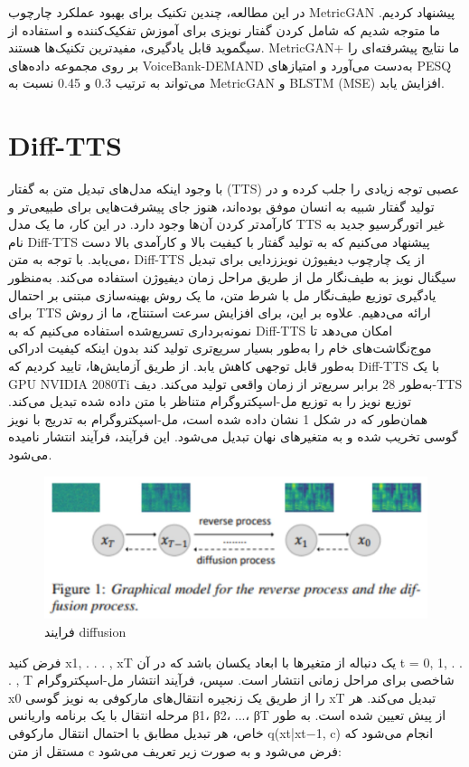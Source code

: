 \documentclass[fleqn]{report}
\begin{document}
در این مطالعه، چندین تکنیک برای بهبود عملکرد چارچوب MetricGAN پیشنهاد کردیم. ما متوجه شدیم که شامل کردن گفتار نویزی برای آموزش تفکیک‌کننده و استفاده از سیگموید قابل یادگیری، مفیدترین تکنیک‌ها هستند. MetricGAN+ ما نتایج پیشرفته‌ای را بر روی مجموعه داده‌های VoiceBank-DEMAND به‌دست می‌آورد و امتیازهای PESQ می‌تواند به ترتیب 0.3 و 0.45 نسبت به MetricGAN و BLSTM (MSE) افزایش یابد.

\section{Diff-TTS}
با وجود اینکه مدل‌های تبدیل متن به گفتار (TTS) عصبی توجه زیادی را جلب کرده و در تولید گفتار شبیه به انسان موفق بوده‌اند، هنوز جای پیشرفت‌هایی برای طبیعی‌تر و کارآمدتر کردن آن‌ها وجود دارد. در این کار، ما یک مدل TTS غیر اتورگرسیو جدید به نام Diff-TTS پیشنهاد می‌کنیم که به تولید گفتار با کیفیت بالا و کارآمدی بالا دست می‌یابد. با توجه به متن، Diff-TTS از یک چارچوب دیفیوژن نویززدایی برای تبدیل سیگنال نویز به طیف‌نگار مل از طریق مراحل زمان دیفیوژن استفاده می‌کند. به‌منظور یادگیری توزیع طیف‌نگار مل با شرط متن، ما یک روش بهینه‌سازی مبتنی بر احتمال برای TTS ارائه می‌دهیم. علاوه بر این، برای افزایش سرعت استنتاج، ما از روش نمونه‌برداری تسریع‌شده استفاده می‌کنیم که به Diff-TTS امکان می‌دهد تا موج‌نگاشت‌های خام را به‌طور بسیار سریع‌تری تولید کند بدون اینکه کیفیت ادراکی به‌طور قابل توجهی کاهش یابد. از طریق آزمایش‌ها، تایید کردیم که Diff-TTS با یک GPU NVIDIA 2080Ti به‌طور 28 برابر سریع‌تر از زمان واقعی تولید می‌کند.
دیف-TTS توزیع نویز را به توزیع مل-اسپکتروگرام متناظر با متن داده شده تبدیل می‌کند. همان‌طور که در شکل 1 نشان داده شده است، مل-اسپکتروگرام به تدریج با نویز گوسی تخریب شده و به متغیرهای نهان تبدیل می‌شود. این فرآیند، فرآیند انتشار نامیده می‌شود.

\begin{figure}[h]

    \centering
    \includegraphics[width=.6\textwidth, keepaspectratio]{images/diffusion.jpg}
    
    \caption{فرایند diffusion}
    \label{fig:diffusion}
\end{figure}

فرض کنید x1, . . . , xT یک دنباله از متغیرها با ابعاد یکسان باشد که در آن t = 0, 1, . . . , T شاخصی برای مراحل زمانی انتشار است. سپس، فرآیند انتشار مل-اسپکتروگرام x0 را از طریق یک زنجیره انتقال‌های مارکوفی به نویز گوسی xT تبدیل می‌کند. هر مرحله انتقال با یک برنامه واریانس β1، β2، ...، βT از پیش تعیین شده است. به طور خاص، هر تبدیل مطابق با احتمال انتقال مارکوفی q(xt|xt−1, c) انجام می‌شود که مستقل از متن c فرض می‌شود و به صورت زیر تعریف می‌شود:
\end{document}
